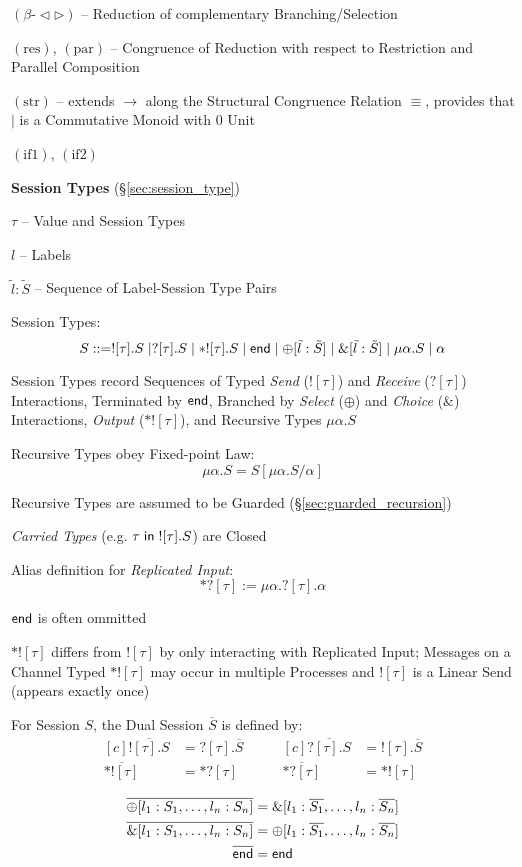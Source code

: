 $(\beta\text{-}\lhd\rhd)$ -- Reduction of complementary
Branching/Selection

$(\text{res})$, $(\text{par})$ -- Congruence of Reduction with respect
to Restriction and Parallel Composition %

$(\text{str})$ -- extends $\rightarrow$ along the Structural
Congruence Relation $\equiv$, provides that $|$ is a Commutative
Monoid with $0$ Unit

$(\text{if1})$, $(\text{if2})$ %


\textbf{Session Types} (\S\ref{sec:session_type})

$\tau$ -- Value and Session Types

$l$ -- Labels

$\tilde{l}:\tilde{S}$ -- Sequence of Label-Session Type Pairs

Session Types:
\[
  S ::= ![\tau].S \mid ?[\tau].S \mid *![\tau].S
    \mid \mathsf{end} \mid \oplus[\tilde{l}:\tilde{S}]
    \mid \&[\tilde{l}:\tilde{S}] \mid \mu\alpha.S \mid \alpha
\]

Session Types record Sequences of Typed \emph{Send} ($![\tau]$) and
\emph{Receive} ($?[\tau]$) Interactions, Terminated by $\mathsf{end}$,
Branched by \emph{Select} ($\oplus$) and \emph{Choice} ($\&$)
Interactions, \emph{Output} ($*![\tau]$), and Recursive Types
$\mu\alpha.S$

Recursive Types obey Fixed-point Law:
\[
  \mu\alpha.S = S[\mu\alpha.S/\alpha]
\]

Recursive Types are assumed to be Guarded
(\S\ref{sec:guarded_recursion})

\emph{Carried Types} (e.g. $\tau \;\mathsf{in}\; ![\tau].S$) are Closed %

Alias definition for \emph{Replicated Input}:
\[
  *?[\tau] := \mu\alpha.?[\tau].\alpha
\]

\fist $\mathsf{end}$ is often ommitted

$*![\tau]$ differs from $![\tau]$ by only interacting with Replicated
Input; Messages on a Channel Typed $*![\tau]$ may occur in multiple
Processes and $![\tau]$ is a Linear Send (appears exactly once)

For Session $S$, the Dual Session $\overline{S}$ is defined by:
\[
\begin{aligned}[c]
  \overline{![\tau].S} &= ?[\tau].\overline{S} \\
  \overline{*![\tau]} &= *?[\tau] \\
\end{aligned}
\quad\quad
\begin{aligned}[c]
  \overline{?[\tau].S} &= ![\tau].\overline{S} \\
  \overline{*?[\tau]} &= *![\tau] \\
\end{aligned}
\]\[
\begin{split}
  \overline{\oplus[l_1:S_1, \ldots, l_n:S_n]}
    &= \&[l_1:\overline{S_1}, \ldots, l_n:\overline{S_n}] \\
  \overline{\&[l_1:S_1, \ldots, l_n:S_n]}
    &= \oplus[l_1:\overline{S_1}, \ldots, l_n:\overline{S_n}] \\
  \overline{\mathsf{end}} &= \mathsf{end}
\end{split}
\]


